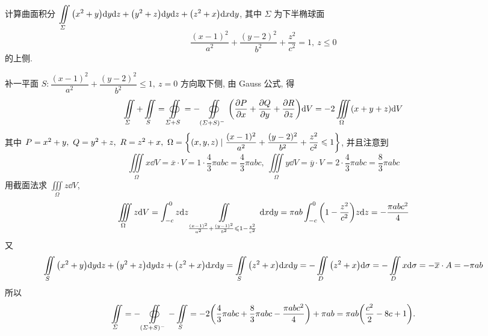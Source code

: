 \begin{example}
    计算曲面积分 $\displaystyle\iint\limits_\varSigma \qty(x^2+y)\dd y\dd z+\qty(y^2+z)\dd y\dd z+\qty(z^2+x)\dd x\dd y$, 其中 $\varSigma$ 为下半椭球面
    $$\dfrac{(x-1)^2}{a^2}+\dfrac{(y-2)^2}{b^2}+\dfrac{z^2}{c^2}=1,~z\leqslant 0$$ 的上侧.
\end{example}
\begin{solution}
    补一平面 $S:\dfrac{(x-1)^2}{a^2}+\dfrac{(y-2)^2}{b^2}\leqslant 1,~z=0$ 方向取下侧, 由 Gauss 公式, 得
    $$\iint\limits_\varSigma+\iint\limits_S=\oiint\limits_{\varSigma+S}=-\oiint\limits_{(\varSigma+S)^-}\qty(\pdv{P}{x}+\pdv{Q}{y}+\pdv{R}{z})\dd V=-2\iiint\limits_{\Omega}(x+y+z)\dd V$$
    其中 $P=x^2+y,~Q=y^2+z,~R=z^2+x,~\Omega=\qty{(x,y,z)\mid \dfrac{(x-1)^2}{a^2}+\dfrac{(y-2)^2}{b^2}+\dfrac{z^2}{c^2}\leqslant 1}$, 并且注意到
    $$\iiint\limits_\Omega x\dd V=\overline{x}\cdot V=1\cdot\dfrac{4}{3}\pi abc=\dfrac{4}{3}\pi abc,~\iiint\limits_{\Omega}y\dd V=\overline{y}\cdot V=2\cdot\dfrac{4}{3}\pi abc=\dfrac{8}{3}\pi abc$$
    用截面法求 $\displaystyle\iiint\limits_\Omega z\dd V$, 
    $$\iiint\limits_\Omega z\dd V=\int_{-c}^{0}z\dd z\iint\limits_{\frac{(x-1)^2}{a^2}+\frac{(y-1)^2}{b^2}\leqslant 1-\frac{z^2}{c^2}}\dd x\dd y=\pi ab\int_{-c}^{0}\qty(1-\dfrac{z^2}{c^2})z\dd z=-\dfrac{\pi abc^2}{4}$$
    又 $$\iint\limits_{S}\qty(x^2+y)\dd y\dd z+\qty(y^2+z)\dd y\dd z+\qty(z^2+x)\dd x\dd y=\iint\limits_{S}\qty(z^2+x)\dd x\dd y=-\iint\limits_D\qty(z^2+x)\dd \sigma=-\iint\limits_Dx\dd \sigma=-\overline{x}\cdot A=-\pi ab$$
    所以 $$\iint\limits_\varSigma=-\oiint\limits_{(\varSigma+S)^-}-\iint\limits_S=-2\qty(\dfrac{4}{3}\pi abc+\dfrac{8}{3}\pi abc-\dfrac{\pi abc^2}{4})+\pi ab=\pi ab\qty(\dfrac{c^2}{2}-8c+1).$$
\end{solution}

